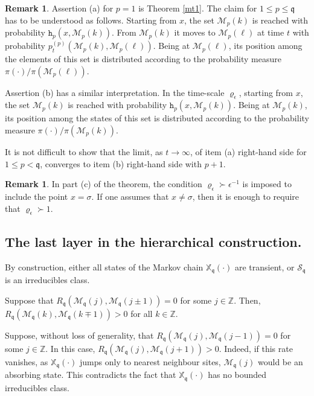\documentclass[reqno]{amsart}
\theoremstyle{plain}
\theoremstyle{definition}
\newtheorem{remark}[theorem]{Remark}
\newcommand{\mf}[1]{{\mathfrak #1}}
\newcommand{\bb}[1]{{\mathbb #1}}
\newcommand{\ms}[1]{{\mathscr #1}}
\newcommand{\mtt}[1]{{\mathtt #1}}
\newcounter{as}[section]
\newcommand{\<}{\langle}
\renewcommand{\>}{\rangle}
\begin{document}
\begin{remark}
Assertion (a) for $p=1$ is Theorem \ref{mt1}. The claim for
$1\le p\le \mf q$ has to be understood as follows. Starting from $x$, the
set $\ms M_p(k)$ is reached with probability
$\mtt h_p (x , \ms M_p(k))$.  From $\ms M_p(k)$ it moves to
$\ms M_p(\ell)$ at time $t$ with probability
$p_{t}^{(p)}(\ms M_p(k), \ms M_p(\ell))$. Being at $\ms M_p(\ell)$,
its position among the elements of this set is distributed according
to the probability measure $\pi(\cdot)/ \pi(\ms M_p(\ell))$.

Assertion (b) has a similar interpretation. In the time-scale
$\varrho_\epsilon$, starting from $x$, the set $\ms M_p(k)$ is reached
with probability $\mtt h_p (x , \ms M_p(k))$. Being at $\ms M_p(k)$,
its position among the states of this set is distributed according to
the probability measure $\pi(\cdot)/ \pi(\ms M_p(k))$.

It is not difficult to show that the limit, as $t\to\infty$, of item
(a) right-hand side for $1\le p <\mf q$, converges to item (b)
right-hand side with $p+1$.
\end{remark}

\begin{remark}
In part (c) of the theorem, the condition
$\varrho_{\epsilon} \succ \epsilon^{-1}$ is imposed to include the
point $x=\sigma$. If one assumes that $x\neq \sigma$, then it is
enough to require that $\varrho_{\epsilon} \succ 1$.
\end{remark}


\subsection*{The last layer in the hierarchical construction.}

By construction, either all states of the Markov chain
$\bb X_{\mf q}(\cdot)$ are transient, or $\ms S_{\mf q}$ is an
irreducibles class. 

\smallskip
{} Suppose that
$R_{\mf q} (\ms M_{\mf q} (j), \ms M_{\mf q} (j\pm 1)) = 0$ for some
$j\in\bb Z$. Then,
$R_{\mf q} (\ms M_{\mf q} (k), \ms M_{\mf q} (k\mp 1)) > 0$ for all
$k\in\bb Z$.

Suppose, without loss of generality, that
$R_{\mf q} (\ms M_{\mf q} (j), \ms M_{\mf q} (j-1))= 0$ for some
$j\in \bb Z$. In this case,
$R_{\mf q} (\ms M_{\mf q} (j), \ms M_{\mf q} (j+1))> 0$.  Indeed, if
this rate vanishes, as $\bb X_{\mf q}(\cdot)$ jumps only to nearest
neighbour sites, $\ms M_{\mf q} (j)$ would be an absorbing state.
This contradicts the fact that $\bb X_{\mf q}(\cdot)$ has no bounded
irreducibles class.
\end{document}

